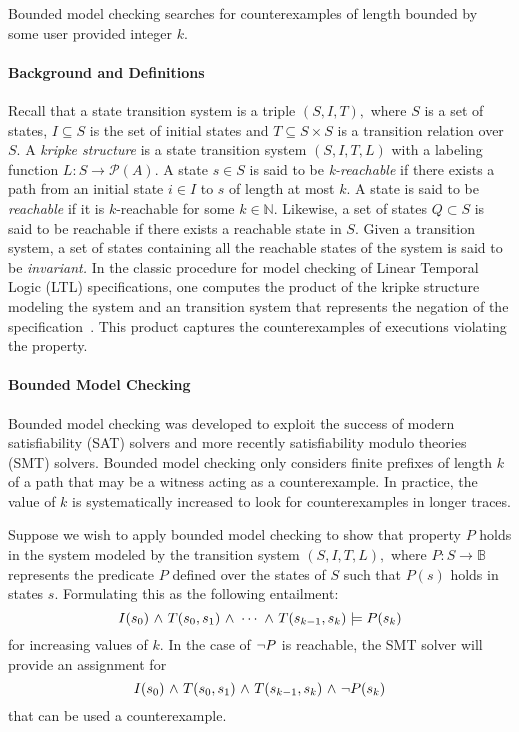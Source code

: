 Bounded model checking searches for
counterexamples of length bounded by some user provided integer $k.$



\paragraph{Background and Definitions} Recall that a state transition system is a triple $(S,I,T),$
where $S$ is a set of states, $I \subseteq S$ is the set of initial
states and $T \subseteq S \times S $ is a transition relation over $S.$ A {\em kripke
  structure} is a state transition system $(S,I,T,L)$  with a labeling function
$L: S \rightarrow  \mathcal{P}(A)$.  A state $s 
\in S$ is said to be {\em k-reachable} if there exists a path from an
initial state $i\in I$ to $s$ of length at most $k.$ A state is said
to be {\em reachable} if it is $k$-reachable for some $k\in \mathbb{N}.$
Likewise, a set of states $Q \subset S$ is said to be reachable if
there exists a reachable state in $S.$  Given a transition system, a
set of states containing all the reachable states of the system is
said to be {\em invariant.} In the classic procedure for model checking of Linear
Temporal Logic (LTL) specifications, one computes the product of
the kripke structure modeling the system and an transition system that
represents the negation of the specification~\cite{ClarkeMC}. This product captures
the counterexamples of executions violating the property. 

\paragraph{Bounded Model Checking} Bounded model checking was developed to exploit the success of modern
satisfiability (SAT) solvers and more recently satisfiability modulo
theories (SMT) solvers. Bounded model checking only considers finite
prefixes of length $k$  of a path that may be a witness acting as a
counterexample. In practice, the value of $k$ is systematically
increased to look for counterexamples in longer traces.  

  
Suppose we wish to apply bounded model checking to show that property
$P$ holds in  the system modeled by the transition
system $(S,I,T,L),$ where $P: S \rightarrow \mathbb{B}$ represents
the predicate $P$ defined over the states of $S$ such that $P(s)$
holds in states $s.$
Formulating this as the following entailment:
$$ I(s_0) {\ \wedge \ } T(s_0,s_1) {\ \wedge \ } \cdots {\ \wedge \ } T(s_{k-1},s_k)
\models P(s_k)$$
for increasing values of $k.$ In the case of ${\neg} P$ is reachable,
the SMT solver will provide an assignment for 
$$I(s_0) {\ \wedge \ } T(s_0,s_1) {\ \wedge \ } T(s_{k-1},s_k) {\ \wedge \ } {\neg}
P(s_k)$$
that can be used a counterexample. 

